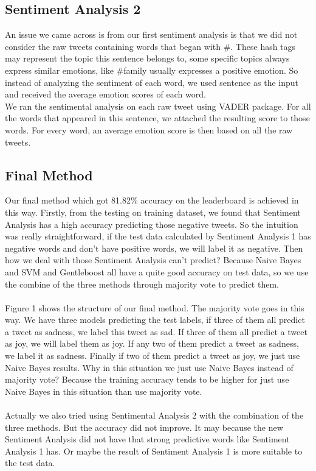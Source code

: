 \documentclass[]{article}
\begin{document}
\subsection{Sentiment Analysis 2}

An issue we came across is from our first sentiment analysis is that we did not consider the raw tweets containing words that began with \#. These hash tags may represent the topic this sentence belongs to, some specific topics always express similar emotions, like \#family usually expresses a positive emotion. So instead of analyzing the sentiment of each word, we used sentence as the input and received the average emotion scores of each word.\\

We ran the sentimental analysis on each raw tweet using VADER package. For all the words that appeared in this sentence, we attached the resulting score to those words. For every word, an average emotion score is then based on all the raw tweets. \\ 

\subsection{Final Method}

Our final method which got 81.82\% accuracy on the leaderboard is achieved in this way. Firstly, from the testing on training dataset, we found that Sentiment Analysis has a high accuracy predicting those negative tweets. So the intuition was really straightforward, if the test data calculated by Sentiment Analysis 1 has negative words and don't have positive words, we will label it as negative. Then how we deal with those Sentiment Analysis can't predict? Because Naive Bayes and SVM and Gentleboost all have a quite good accuracy on test data, so we use the combine of the three methods through majority vote to predict them.\\\\
Figure 1 shows the structure of our final method. The majority vote goes in this way. We have three models predicting the test labels, if three of them all predict a tweet as sadness, we label this tweet as sad. If three of them all predict a tweet as joy, we will label them as joy. If any two of them predict a tweet as sadness, we label it as sadness. Finally if two of them predict a tweet as joy, we just use Naive Bayes results. Why in this situation we just use Naive Bayes instead of majority vote? Because the training accuracy tends to be higher for just use Naive Bayes in this situation than use majority vote.\\\\
Actually we also tried using Sentimental Analysis 2 with the combination of the three methods. But the accuracy did not improve. It may because the new Sentiment Analysis did not have that strong predictive words like Sentiment Analysis 1 has. Or maybe the result of Sentiment Analysis 1 is more suitable to the test data.
\end{document}
